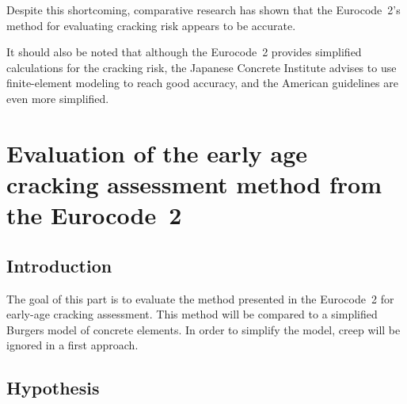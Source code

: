 \documentclass[a4paper,11pt]{memoir}
\begin{document}
Despite this shortcoming, comparative research has shown that the Eurocode~2's
method for evaluating cracking risk appears to be accurate.

It should also be noted that although the Eurocode~2 provides simplified
calculations for the cracking risk, the Japanese Concrete Institute advises to
use finite-element modeling to reach good accuracy, and the American guidelines
are even more simplified.

\chapter[Evaluation of Eurocode~2]{Evaluation of the early age cracking assessment method from the
Eurocode~2}
\section{Introduction}
The goal of this part is to evaluate the method presented in the Eurocode~2 for
early-age cracking assessment. This method will be compared to a simplified
Burgers model \cite{soa} of concrete elements. In order to simplify the
model, creep will be ignored in a first approach.

\section{Hypothesis}


\backmatter
\printbibliography
\end{document}
